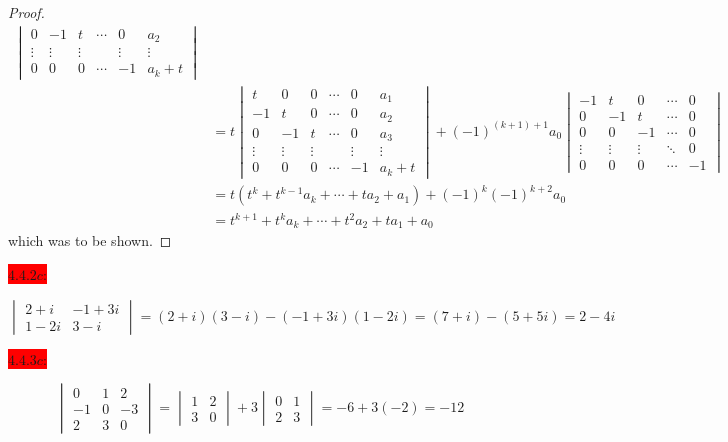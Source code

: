 \documentclass{exam}
\begin{document}
\begin{solution}
\begin{proof}
\begin{align*}
\begin{vmatrix}
          0 & -1 & t & \cdots & 0 & a_2 \\
          \vdots & \vdots & \vdots & & \vdots & \vdots \\
          0 & 0 & 0 & \cdots & -1 & a_{k} + t
        \end{vmatrix} \\
        &= t\begin{vmatrix}
          t & 0 & 0 & \cdots & 0 & a_1 \\
          -1 & t & 0 & \cdots & 0 & a_2 \\
          0 & -1 & t & \cdots & 0 & a_3 \\
          \vdots & \vdots & \vdots & & \vdots & \vdots \\
          0 & 0 & 0 & \cdots & -1 & a_{k} + t
        \end{vmatrix}
        + (-1)^{(k+1)+1}a_0\begin{vmatrix}
          -1 & t & 0 & \cdots & 0 \\
          0 & -1 & t & \cdots & 0 \\
          0 & 0 & -1 & \cdots & 0 \\
          \vdots & \vdots & \vdots & \ddots & 0 \\
          0 & 0 & 0 & \cdots & -1
        \end{vmatrix} \\
        &= t(t^{k} + t^{k-1}a_{k} + \cdots + t a_{2} + a_1) + (-1)^{k}(-1)^{k+2}a_0 \tag{IH with $a_1, \dots, a_k$; Problem~4.2.23} \\
        &= t^{k+1} + t^{k}a_k + \cdots + t^{2}a_2 + t a_1 + a_0
      \end{align*}
      which was to be shown. 
    \end{proof}
  \end{solution}

  \colorbox{red}{\underline{$4.4.2c$}:}
  \begin{solution}
    \[
      \begin{vmatrix}
        2 + i & -1 + 3i \\
        1 - 2i & 3 - i
      \end{vmatrix}
      = (2 + i)(3 - i) - (-1 +3i)(1 - 2i) = (7 + i) - (5 + 5i) = \boxed{2 - 4i}
    \]
  \end{solution}

  \newpage 

  \colorbox{red}{\underline{$4.4.3c$}:}
  \begin{solution}
    \[
      \begin{vmatrix}
        0 & 1 & 2 \\
        -1 & 0 & -3 \\
        2 & 3 & 0
      \end{vmatrix}
      = \begin{vmatrix}
        1 & 2 \\
        3 & 0
      \end{vmatrix}
      + 3\begin{vmatrix}
        0 & 1 \\
        2 & 3
      \end{vmatrix}
      = -6 + 3(-2) = \boxed{-12}
    \]
  \end{solution}
\end{document}
